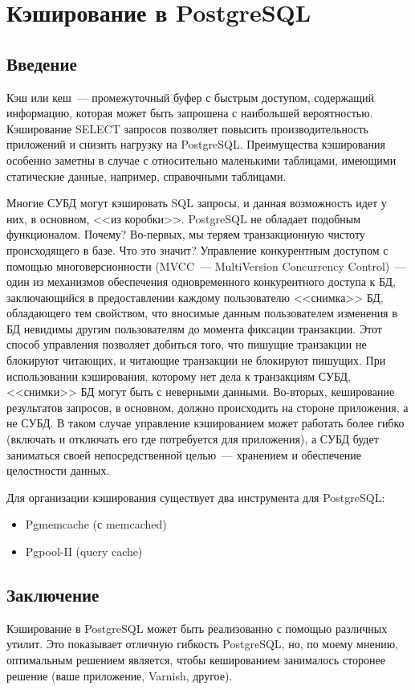 \chapter{Кэширование в PostgreSQL}

\begin{epigraphs}
\end{epigraphs}

\section{Введение}

Кэш или кеш~--- промежуточный буфер с быстрым доступом, содержащий информацию, которая может быть запрошена с наибольшей вероятностью. Кэширование SELECT запросов позволяет повысить производительность приложений и снизить нагрузку на PostgreSQL. Преимущества кэширования особенно заметны в случае с относительно маленькими таблицами, имеющими статические данные, например, справочными таблицами.

Многие СУБД могут кэшировать SQL запросы, и данная возможность идет у них, в основном, <<из коробки>>. PostgreSQL не обладает подобным функционалом. Почему? Во-первых, мы теряем транзакционную чистоту происходящего в базе. Что это значит? Управление конкурентным доступом с помощью многоверсионности (MVCC~--- MultiVersion Concurrency Control)~--- один из механизмов обеспечения одновременного конкурентного доступа к БД, заключающийся в предоставлении каждому пользователю <<снимка>> БД, обладающего тем свойством, что вносимые данным пользователем изменения в БД невидимы другим пользователям до момента фиксации транзакции. Этот способ управления позволяет добиться того, что пишущие транзакции не блокируют читающих, и читающие транзакции не блокируют пишущих. При использовании кэширования, которому нет дела к транзакциям СУБД, <<снимки>> БД могут быть с неверными данными. Во-вторых, кеширование результатов запросов, в основном, должно происходить на стороне приложения, а не СУБД. В таком случае управление кэшированием может работать более гибко (включать и отключать его где потребуется для приложения), а СУБД будет заниматься своей непосредственной целью~--- хранением и обеспечение целостности данных.

Для организации кэширования существует два инструмента для PostgreSQL:

\begin{itemize}
  \item Pgmemcache (с memcached)
  \item Pgpool-II (query cache)
\end{itemize}





\section{Заключение}

Кэширование в PostgreSQL может быть реализованно с помощью различных утилит. Это показывает отличную гибкость PostgreSQL, но, по моему мнению, оптимальным решением является, чтобы кешированием занималось сторонее решение (ваше приложение, Varnish, другое).
